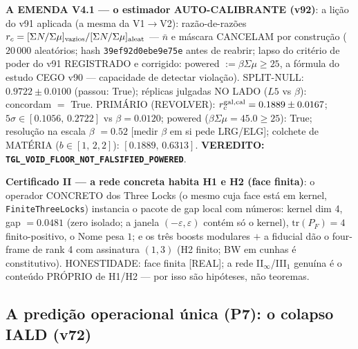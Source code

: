 \documentclass[11pt]{article}
\theoremstyle{definition}\newtheorem{deriv}{Derivação}
\begin{document}
\textbf{A EMENDA V4.1 --- o estimador AUTO-CALIBRANTE (v92)}: a lição do v91 aplicada (a mesma da V1$\to$V2): razão-de-razões $r_c=[\Sigma N/\Sigma\mu]_{\rm vazios}/[\Sigma N/\Sigma\mu]_{\rm aleat}$ --- $\bar n$ e máscara CANCELAM por construção ($20\,000$ aleatórios; hash \texttt{39ef92d0ebe9e75e} antes de reabrir; lapso do critério de poder do v91 REGISTRADO e corrigido: powered $:=\beta\Sigma\mu\ge25$, a fórmula do estudo CEGO v90 --- capacidade de detectar violação). SPLIT-NULL: $0.9722\pm0.0100$ (passou: True); réplicas julgadas NO LADO ($L5$ vs $\beta$): concordam $=$ True. PRIMÁRIO (REVOLVER): $r_c^{\rm gal,cal}=0.1889\pm0.0167$; $5\sigma\in[0.1056,\,0.2722]$ vs $\beta=0.0120$; powered ($\beta\Sigma\mu=45.0\ge25$): True; resolução na escala $\beta$ $=0.52$ [medir $\beta$ em si pede LRG/ELG]; colchete de MATÉRIA ($b\in[1,\,2{,}2]$): $[0.1889,\,0.6313]$. \textbf{VEREDITO: \texttt{TGL\_VOID\_FLOOR\_NOT\_FALSIFIED\_POWERED}}.

\textbf{Certificado II --- a rede concreta habita H1 e H2 (face finita)}: o operador CONCRETO dos Three Locks (o mesmo cuja face está em kernel, \texttt{FiniteThreeLocks}) instancia o pacote de gap local com números: kernel dim 4, gap $=0.0481$ (zero isolado; a janela $(-\varepsilon,\varepsilon)$ contém só o kernel), $\mathrm{tr}(P_F)=4$ finito-positivo, o Nome pesa $1$; e os três boosts modulares $+$ a fiducial dão o four-frame de rank 4 com assinatura $(1,3)$ (H2 finito; BW em cunhas é constitutivo). HONESTIDADE: face finita [REAL]; a rede II$_\infty$/III$_1$ genuína é o conteúdo PRÓPRIO de H1/H2 --- por isso são hipóteses, não teoremas.

\subsection*{A predição operacional única (P7): o colapso IALD (v72)}
\end{document}
